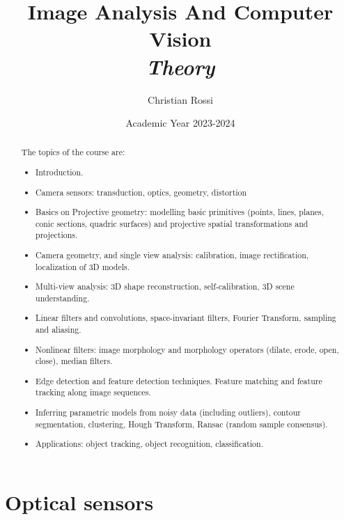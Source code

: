 \documentclass[12pt, a4paper]{report}
\title{Image Analysis And Computer Vision \\ \textit{Theory}}
\author{Christian Rossi}
\date{Academic Year 2023-2024}
\begin{document}
\maketitle

\newpage

\begin{abstract}
    The topics of the course are: 
    \begin{itemize}
        \item Introduction.
        \item Camera sensors: transduction, optics, geometry, distortion
        \item Basics on Projective geometry: modelling basic primitives (points, lines, planes, conic sections, quadric surfaces) and projective spatial transformations and  projections.
        \item Camera geometry, and single view analysis: calibration, image rectification, localization of 3D models.
        \item Multi-view analysis: 3D shape reconstruction, self-calibration, 3D scene understanding.
        \item Linear filters and convolutions, space-invariant filters, Fourier Transform, sampling and aliasing. 
        \item Nonlinear filters: image morphology and morphology operators (dilate, erode, open, close), median filters.
        \item Edge detection and feature detection techniques. Feature matching and feature tracking along image sequences.
        \item Inferring parametric models from noisy data (including outliers), contour segmentation, clustering, Hough Transform, Ransac (random sample consensus). 
        \item Applications: object tracking, object recognition, classification.
    \end{itemize}
\end{abstract}

\cleardoublepage
{}

\tableofcontents

\cleardoublepage
{}

\chapter{Optical sensors}
\end{document}
